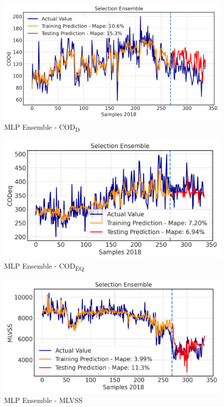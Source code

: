 \begin{figure}[h!]
\centering
\includegraphics[width=\linewidth]{figures/Ch5/CODd-ann2.png}
\caption{MLP Ensemble - COD\textsubscript{D}}
\label{f:ann2-codd}
\end{figure}

\begin{figure}[h!]
\centering
\includegraphics[width=\linewidth]{figures/Ch5/CODeq-ann2.png}
\caption{MLP Ensemble - COD\textsubscript{EQ}}
\label{f:ann2-codeq}
\end{figure}

\begin{figure}[h!]
\centering
\includegraphics[width=\linewidth]{figures/Ch5/MVLSS-E_ann2.png}
\caption{MLP Ensemble - MLVSS}
\label{f:ann2-MLVSS}
\end{figure}

